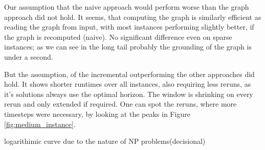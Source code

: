 Our assumption that the naive approach would perform worse than the graph approach did not hold. It seems, that computing the graph is similarly efficient as reading the graph from input, with most instances performing slightly better, if the graph is recomputed (naive).
\color{red}No significant difference even on sparse instances; as we can see in the long tail probably the grounding of the graph is under a second.
\color{black}

But the assumption, of the incremental outperforming the other approaches did hold. It shows shorter runtimes over all instances, also requiring less reruns, as it's solutions always use the optimal horizon. The window is shrinking on every rerun and only extended if required. One can spot the reruns, where more timesteps were necessary, by looking at the peaks in Figure \ref{fig:medium_instance}.


\color{red}logarithimic curve due to the nature of NP problems(decisional)


\color{black}
